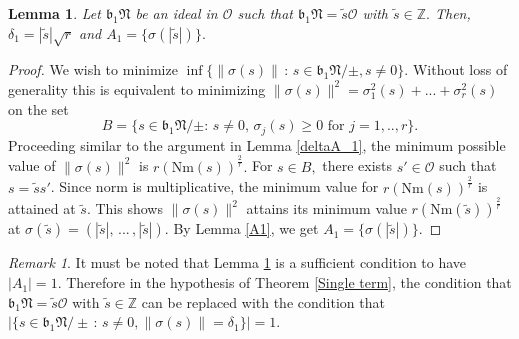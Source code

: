 \documentclass[reqno]{amsart}
\theoremstyle{plain}
\newtheorem{lemma}[theorem]{Lemma}
\theoremstyle{definition}
\theoremstyle{remark}
\newtheorem{remark}{Remark}
\def\Nr{\mathrm{Nm}}
\begin{document}
 \begin{lemma}\label{A1A1}
Let $\mathfrak{b}_1\mathfrak{N}$ be an ideal in $\mathcal{O}$  such that $\mathfrak{b}_1\mathfrak{N}=\tilde{s}\mathcal{O}$ with $\tilde{s}\in \mathbb{Z}.$  Then, $\delta_1=|\tilde{s}|\sqrt{r}$ and $A_1=\{\sigma(|\tilde{s}|)\}.$
\end{lemma}
\begin{proof}
We wish to minimize $\inf\{\|\sigma(s)\|  \, : \, s\in \mathfrak{b}_1\mathfrak{N}/\pm, s\neq 0 \}.$ Without loss of generality this is equivalent to minimizing $\|\sigma(s)\|^2 =\sigma_1^2(s)+ ... +\sigma_r^2(s)  $ on the set 
 $$
 B=\{s\in \mathfrak{b}_1\mathfrak{N}/\pm :\,s\neq 0,\,\sigma_j(s)\geq 0 \textrm{ for } j=1,..,r \}.
 $$ 
 Proceeding similar to the argument in Lemma \ref{deltaA_1}, the minimum possible value of $\|\sigma(s)\|^2$ is  $r(\Nr(s))^{\frac{2}{r}}. $ 
 For $s\in B, $  there exists $s'\in \mathcal{O}$ such that $s=\tilde{s}s'$. Since norm is multiplicative, the  minimum value for $r(\Nr(s))^{\frac{2}{r}} $ is attained at $\tilde s$. This shows $\| \sigma(s) \|^2$ attains its minimum value $r(\Nr(\tilde{s}))^{\frac{2}{r}}$ at $\sigma(\tilde s)=(|\tilde{s}|,\,...\,,|\tilde{s}|).$ By Lemma \ref{A1}, we get $A_1=\{\sigma(|\tilde{s}|)\}.$
\end{proof}
\begin{remark}
It must be noted that Lemma \ref{A1A1} is a sufficient condition to have $|A_1|=1.$
Therefore in the hypothesis of  Theorem \ref{Single term}, the condition that $\mathfrak{b}_1\mathfrak{N}=\tilde{s}\mathcal{O} $ with $\tilde{s}\in \mathbb{Z}$   can be replaced  with the condition that $|\{s \in \mathfrak{b}_1\mathfrak{N}/\pm \, : \, s\neq 0, \|\sigma(s)\|=\delta_1\}|=1$.
\end{remark}
\end{document}
